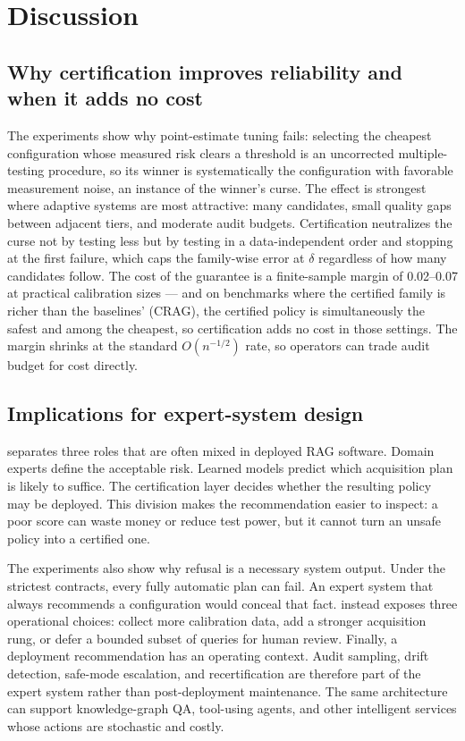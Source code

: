 \section{Discussion}
\label{sec:discussion}

\subsection{Why certification improves reliability and when it adds no cost}
The experiments show why point-estimate tuning fails:
selecting the cheapest configuration whose measured risk clears a
threshold is an uncorrected multiple-testing procedure, so its winner
is systematically the configuration with favorable measurement noise,
an instance of the winner's curse. The effect is strongest where adaptive
systems are most attractive: many candidates, small quality gaps
between adjacent tiers, and moderate audit budgets. Certification
neutralizes the curse not by testing less but by testing in a
data-independent order and stopping at the first failure, which caps
the family-wise error at $\delta$ regardless of how many candidates
follow. The cost of the guarantee is a finite-sample margin of
0.02--0.07 at practical calibration sizes --- and on benchmarks where
the certified family is richer than the baselines' (CRAG), the
certified policy is simultaneously the safest and among the cheapest,
so certification adds no cost in those settings. The margin shrinks at the standard
$O(n^{-1/2})$ rate, so operators can trade audit budget for cost
directly.

\subsection{Implications for expert-system design}
\system separates three roles that are often mixed in deployed RAG
software. Domain experts define the acceptable risk. Learned models
predict which acquisition plan is likely to suffice. The certification
layer decides whether the resulting policy may be deployed. This
division makes the recommendation easier to inspect: a poor score can
waste money or reduce test power, but it cannot turn an unsafe policy
into a certified one.

The experiments also show why refusal is a necessary system output.
Under the strictest contracts, every fully automatic plan can fail.
An expert system that always recommends a configuration would conceal
that fact. \system instead exposes three operational choices: collect
more calibration data, add a stronger acquisition rung, or defer a
bounded subset of queries for human review. Finally, a deployment
recommendation has an operating context. Audit sampling, drift
detection, safe-mode escalation, and recertification are therefore part
of the expert system rather than post-deployment maintenance. The same
architecture can support knowledge-graph QA, tool-using agents, and
other intelligent services whose actions are stochastic and costly.

